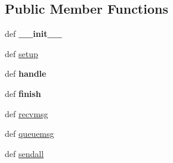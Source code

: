 \subsection*{Public Member Functions}
\begin{DoxyCompactItemize}
\item 
\hypertarget{classcore_1_1coreserver_1_1_core_datagram_request_handler_ada903989e37455a48f8803c8ea6fa3d1}{def {\bfseries \+\_\+\+\_\+init\+\_\+\+\_\+}}\label{classcore_1_1coreserver_1_1_core_datagram_request_handler_ada903989e37455a48f8803c8ea6fa3d1}

\item 
def \hyperlink{classcore_1_1coreserver_1_1_core_datagram_request_handler_a55320dcbc4d6dee8ff55774587159b17}{setup}
\item 
\hypertarget{classcore_1_1coreserver_1_1_core_datagram_request_handler_a71c6d0fb4a56124dda17e6880229462f}{def {\bfseries handle}}\label{classcore_1_1coreserver_1_1_core_datagram_request_handler_a71c6d0fb4a56124dda17e6880229462f}

\item 
\hypertarget{classcore_1_1coreserver_1_1_core_datagram_request_handler_a65a46ce91902779c24a69a527a68b882}{def {\bfseries finish}}\label{classcore_1_1coreserver_1_1_core_datagram_request_handler_a65a46ce91902779c24a69a527a68b882}

\item 
def \hyperlink{classcore_1_1coreserver_1_1_core_datagram_request_handler_ac6b4df13d37dc8da82c9a70c09ebf55e}{recvmsg}
\item 
def \hyperlink{classcore_1_1coreserver_1_1_core_datagram_request_handler_a7530dd539fe9917dbb2b1dffc7f8a20d}{queuemsg}
\item 
def \hyperlink{classcore_1_1coreserver_1_1_core_datagram_request_handler_aa0fa0bb2ed6e532bf22e5350b70557b1}{sendall}
\end{DoxyCompactItemize}
